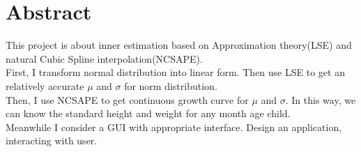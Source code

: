 \documentclass[
10pt, %
a4paper, %
oneside, %
headinclude,footinclude, %
BCOR5mm, %
]{scrartcl}
\begin{document}
\section*{Abstract} %
This project is about inner estimation based on Approximation theory(LSE) and natural Cubic Spline interpolation(NCSAPE).
 \\First, I transform normal distribution into linear form. Then use LSE to get an relatively accurate $\mu$ and $\sigma$ for norm distribution. \\Then, I use NCSAPE to get continuous growth curve for $\mu$ and $\sigma$. In this way, we can know the standard height and weight for any month age child.
 \\Meanwhile I consider a  GUI with appropriate  interface. Design an application, interacting with user.
\end{document}
